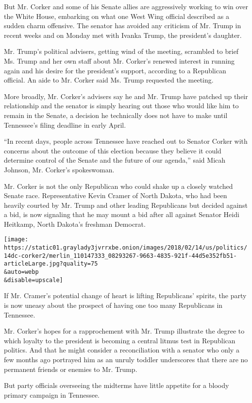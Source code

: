 But Mr. Corker and some of his Senate allies are aggressively working to
win over the White House, embarking on what one West Wing official
described as a sudden charm offensive. The senator has avoided any
criticism of Mr. Trump in recent weeks and on Monday met with Ivanka
Trump, the president's daughter.

Mr. Trump's political advisers, getting wind of the meeting, scrambled
to brief Ms. Trump and her own staff about Mr. Corker's renewed interest
in running again and his desire for the president's support, according
to a Republican official. An aide to Mr. Corker said Ms. Trump requested
the meeting.

More broadly, Mr. Corker's advisers say he and Mr. Trump have patched up
their relationship and the senator is simply hearing out those who would
like him to remain in the Senate, a decision he technically does not
have to make until Tennessee's filing deadline in early April.

``In recent days, people across Tennessee have reached out to Senator
Corker with concerns about the outcome of this election because they
believe it could determine control of the Senate and the future of our
agenda,'' said Micah Johnson, Mr. Corker's spokeswoman.

Mr. Corker is not the only Republican who could shake up a closely
watched Senate race. Representative Kevin Cramer of North Dakota, who
had been heavily courted by Mr. Trump and other leading Republicans but
decided against a bid, is now signaling that he may mount a bid after
all against Senator Heidi Heitkamp, North Dakota's freshman Democrat.

\texttt{[image: https://static01.graylady3jvrrxbe.onion/images/2018/02/14/us/politics/14dc-corker2/merlin\_110147333\_08293267-9663-4835-921f-44d5e352fb51-articleLarge.jpg?quality=75\\\&auto=webp\\\&disable=upscale]}

If Mr. Cramer's potential change of heart is lifting Republicans'
spirits, the party is now uneasy about the prospect of having one too
many Republicans in Tennessee.

Mr. Corker's hopes for a rapprochement with Mr. Trump illustrate the
degree to which loyalty to the president is becoming a central litmus
test in Republican politics. And that he might consider a reconciliation
with a senator who only a few months ago portrayed him as an unruly
toddler underscores that there are no permanent friends or enemies to
Mr. Trump.

But party officials overseeing the midterms have little appetite for a
bloody primary campaign in Tennessee.

